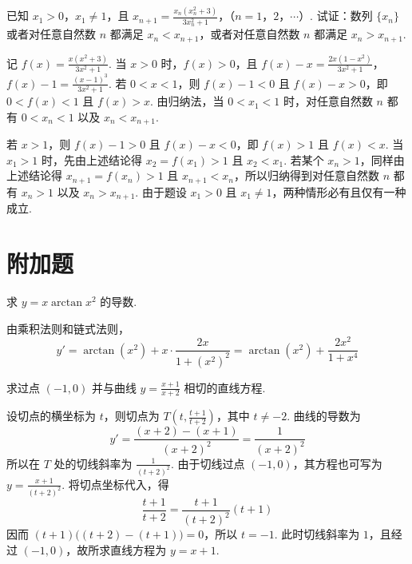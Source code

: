 \begin{problem}

已知 \(x_1 > 0\)，\(x_1 \neq 1\)，且 \(x_{n+1} = \frac{x_n(x_n^2 + 3)}{3x_n^2 + 1}\)，（\(n = 1\)，\(2\)，\(\cdots\)）. 试证：数列 \(\{x_n\}\) 或者对任意自然数 \(n\) 都满足 \(x_n < x_{n+1}\)，或者对任意自然数 \(n\) 都满足 \(x_n > x_{n+1}\).
\end{problem}

\begin{solution}
记 \(f(x)=\frac{x(x^2+3)}{3x^2+1}\). 当 \(x>0\) 时，\(f(x)>0\)，且
\(f(x)-x=\frac{2x(1-x^2)}{3x^2+1}\)，\(f(x)-1=\frac{(x-1)^3}{3x^2+1}\).
若 \(0<x<1\)，则 \(f(x)-1<0\) 且 \(f(x)-x>0\)，即 \(0<f(x)<1\) 且 \(f(x)>x\). 由归纳法，当 \(0<x_1<1\) 时，对任意自然数 \(n\) 都有 \(0<x_n<1\) 以及 \(x_n<x_{n+1}\).

若 \(x>1\)，则 \(f(x)-1>0\) 且 \(f(x)-x<0\)，即 \(f(x)>1\) 且 \(f(x)<x\). 当 \(x_1>1\) 时，先由上述结论得 \(x_2=f(x_1)>1\) 且 \(x_2<x_1\). 若某个 \(x_n>1\)，同样由上述结论得 \(x_{n+1}=f(x_n)>1\) 且 \(x_{n+1}<x_n\)，所以归纳得到对任意自然数 \(n\) 都有 \(x_n>1\) 以及 \(x_n>x_{n+1}\). 由于题设 \(x_1>0\) 且 \(x_1\neq1\)，两种情形必有且仅有一种成立.
\end{solution}


\section{附加题}

\begin{problem}

求 \(y = x \arctan x^2\) 的导数.
\end{problem}

\begin{solution}
由乘积法则和链式法则，
\[
y'=\arctan\left(x^2\right)+x\cdot\frac{2x}{1+(x^2)^2}=\arctan\left(x^2\right)+\frac{2x^2}{1+x^4}
\]
\end{solution}

\begin{problem}

求过点 \((-1,0)\) 并与曲线 \(y = \frac{x + 1}{x + 2}\) 相切的直线方程.
\end{problem}

\begin{solution}
设切点的横坐标为 \(t\)，则切点为 \(T\left(t,\frac{t+1}{t+2}\right)\)，其中 \(t\neq-2\). 曲线的导数为
\[
y'=\frac{(x+2)-(x+1)}{(x+2)^2}=\frac{1}{(x+2)^2}
\]
所以在 \(T\) 处的切线斜率为 \(\frac{1}{(t+2)^2}\). 由于切线过点 \((-1,0)\)，其方程也可写为 \(y=\frac{x+1}{(t+2)^2}\). 将切点坐标代入，得
\[
\frac{t+1}{t+2}=\frac{t+1}{(t+2)^2}(t+1)
\]
因而 \((t+1)\bigl((t+2)-(t+1)\bigr)=0\)，所以 \(t=-1\). 此时切线斜率为 \(1\)，且经过 \((-1,0)\)，故所求直线方程为 \(y=x+1\).
\end{solution}
